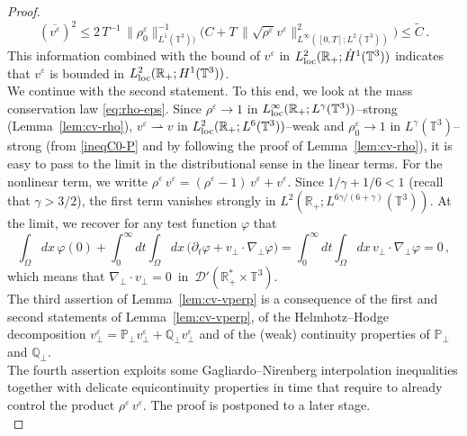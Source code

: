 \documentclass[11pt,reqno]{amsart}
\def \R{{\mathbb{R}}}
\def \Q{{\mathbb{Q}}}
\def \T{{\mathbb{T}}}
\def \P{{\mathbb{P}}}
\begin{document}
\begin{proof}
\begin{equation*}
   (\overline{ v^\varepsilon})^2 \leq 2 \, T^{-1} \, \| \rho_0^\varepsilon\|_{L^1(\T^3))}^{-1}
   \big( { C}  + T \, \|\sqrt{ \rho^\varepsilon}v^\varepsilon \|_{L^\infty([0,T];L^2(\T^3))}^2\big) \leq \widetilde C \, .
 \end{equation*}
 This information combined with the bound of  $v^\varepsilon$ in $L_{\rm loc}^2(\R_+; \dot H^1 (\T^3))$ indicates that $v^\varepsilon$ is  bounded in $L_{\rm loc}^2(\R_+; H^1 (\T^3))$.\\
 We continue with the second statement. To this end, we look at the mass conservation law \eqref{eq:rho-eps}. Since $\rho^\varepsilon \rightarrow 1$ in $L_{\rm loc}^\infty(\R_+; L^\gamma(\T^3))$--strong (Lemma~\ref{lem:cv-rho}),   $v^\varepsilon \rightharpoonup v $ in $L_{\rm loc}^2(\R_+; L^6(\T^3))$--weak and $\rho_0^\varepsilon \rightarrow 1$ in $L^\gamma(\T^3)$--strong (from \eqref{ineqC0-P} and by following the proof of Lemma~\ref{lem:cv-rho}), it is easy to pass to the limit in the distributional sense in the linear terms. For the nonlinear term, we writte $ \rho^\varepsilon \, v^\varepsilon =  (\rho^\varepsilon -1) \, v^\varepsilon +  v^\varepsilon $. Since $1/\gamma + 1/6 < 1$ (recall that $\gamma>3/2$), the first term vanishes strongly in $L^2(\R_+;L^{6\gamma/(6+\gamma)}(\T^3))$. At the limit, we recover for any test function $ \varphi $ that
    \[
    \int_\Omega dx\, \varphi(0) +
    \int_0^\infty dt \int_\Omega dx \,\big(\partial_t  \varphi+ v_\perp \cdot \nabla_\perp \varphi\big)
    = \int_0^\infty dt \int_\Omega dx \, v_\perp \cdot \nabla_\perp \varphi = 0 \,,
    \]
    which means that $\nabla_\perp \cdot v_\perp =0\,$ in $\,\mathcal D'(\R_+^*\times \T^3)$.\\
    The third assertion of Lemma~\ref{lem:cv-vperp} is a  consequence of the first and second statements of Lemma~\ref{lem:cv-vperp}, of the Helmhotz--Hodge decomposition $v_\perp^\varepsilon = \P_\perp v_\perp^\varepsilon + \Q_\perp v_\perp^\varepsilon$ and of the (weak) continuity properties of $ \P_\perp $ and $ \Q_\perp $.\\
    The fourth assertion exploits some Gagliardo--Nirenberg interpolation inequalities together with delicate equicontinuity properties in time that require to already control the product $\rho^\varepsilon \, v^\varepsilon $. The proof is postponed  to a later stage.\\

\end{proof}
\end{document}
